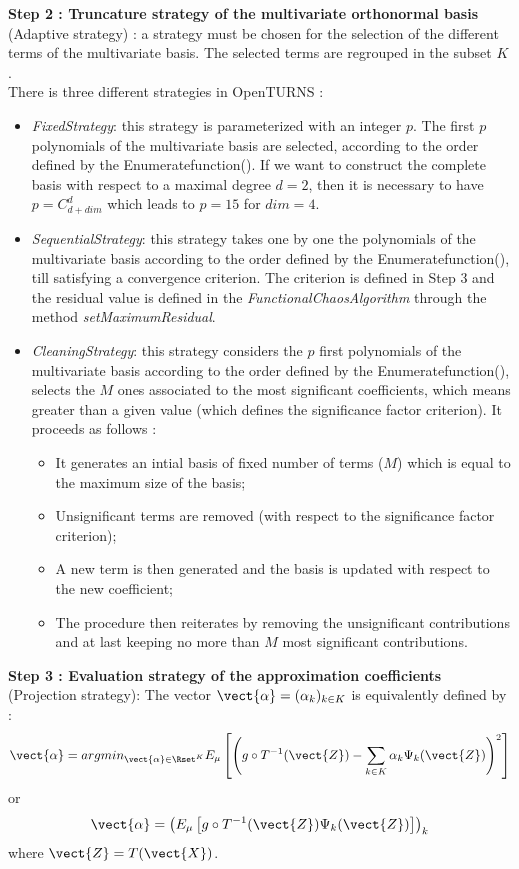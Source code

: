 {\bf Step 2 : Truncature strategy of the multivariate orthonormal basis} (Adaptive strategy) : a strategy must be chosen for the selection of the different terms of the multivariate basis. The selected terms are regrouped in the subset $K$.\\
There is three different strategies in OpenTURNS :
\begin{itemize}
\item   {\itshape FixedStrategy}: this strategy is parameterized with an integer $p$. The first $p$ polynomials of the multivariate basis are selected, according to the order defined by the Enumeratefunction(). If we want to construct the complete basis with respect to a maximal degree $d = 2$, then it is necessary to have $p = C_{d+dim}^d$ which leads to $p=15$ for $dim=4$.
\item   {\itshape SequentialStrategy}: this strategy takes one by one the polynomials of the multivariate basis according to the order defined by the Enumeratefunction(), till satisfying a convergence criterion. The criterion is defined in Step 3 and the residual value is defined in the {\itshape FunctionalChaosAlgorithm} through the method {\itshape setMaximumResidual}.
\item   {\itshape CleaningStrategy}: this strategy considers the $p$  first polynomials of the multivariate basis according to the order defined by the Enumeratefunction(), selects the $M$ ones associated to the most significant coefficients, which means greater than a given value (which defines the significance factor criterion). It proceeds as follows :
  \begin{itemize}
  \item It generates an intial basis of fixed number of terms ($M$) which is equal to the maximum size of the basis;
  \item Unsignificant terms are removed (with respect to the significance factor criterion);
  \item A new term is then generated and the basis is updated with respect to the new coefficient;
  \item The procedure then reiterates by removing the unsignificant contributions and at last keeping no more than $M$ most significant contributions.
  \end{itemize}
\end{itemize}
\vspace*{0.1cm}

{\bf Step 3 : Evaluation strategy of the approximation coefficients} (Projection strategy): The vector  $\vect{\alpha} = (\alpha_k)_{k \in K}$  is  equivalently defined by :
\begin{equation}\label{defArgMin}
  \vect{\alpha} = argmin_{\vect{\alpha} \in \Rset^K} E_{\mu} \left[ \left( g \circ T^{-1}(\vect{Z}) -  \sum_{k \in K} \alpha_k \Psi_k (\vect{Z})\right)^2  \right]
\end{equation}
or
\begin{equation}\label{defEsp}
  \vect{\alpha} = \left( E_{\mu} \left[ g \circ T^{-1}(\vect{Z}) \Psi_k (\vect{Z}) \right]\right)_k
\end{equation}
where $\vect{Z} = T(\vect{X})$.\\

